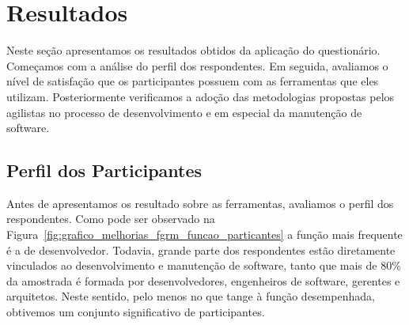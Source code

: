 




\section{Resultados}
\label{sec:analise_dados}

Neste seção apresentamos os resultados obtidos da aplicação do questionário.
Começamos com a análise do perfil dos respondentes. Em seguida, avaliamos o
nível de satisfação que os participantes possuem com as ferramentas que eles
utilizam. Posteriormente verificamos a adoção das metodologias propostas pelos
agilistas no processo de desenvolvimento e em especial da manutenção de
software.

\subsection{Perfil dos Participantes}
\label{sub:pesquisa_prof_perfil_dos_participantes}

Antes de apresentamos os resultado sobre as ferramentas, avaliamos o perfil dos
respondentes. Como pode ser observado na
Figura~\ref{fig:grafico_melhorias_fgrm_funcao_particantes} a função mais
frequente é a de desenvolvedor. Todavia, grande parte dos respondentes estão
diretamente vinculados ao desenvolvimento e manutenção de software, tanto que
mais de 80\% da amostrada é formada por desenvolvedores, engenheiros de
software, gerentes e arquitetos. Neste sentido, pelo menos no que tange à função
desempenhada, obtivemos um conjunto significativo de participantes.

